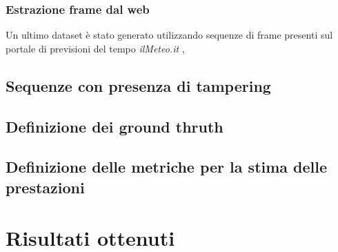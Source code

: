 \subsubsection{Estrazione frame dal web}
Un ultimo dataset \`e stato generato utilizzando sequenze di frame presenti sul portale di previsioni del tempo \textit{ilMeteo.it} \cite{ilmeteo}, 
\subsection{Sequenze con presenza di tampering}
\subsection{Definizione dei ground thruth}
\subsection{Definizione delle metriche per la stima delle prestazioni}
\section{Risultati ottenuti}